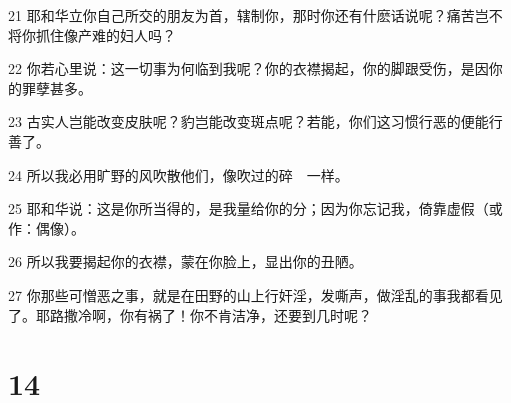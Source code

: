 \par 21 耶和华立你自己所交的朋友为首，辖制你，那时你还有什麽话说呢？痛苦岂不将你抓住像产难的妇人吗？
\par 22 你若心里说：这一切事为何临到我呢？你的衣襟揭起，你的脚跟受伤，是因你的罪孽甚多。
\par 23 古实人岂能改变皮肤呢？豹岂能改变斑点呢？若能，你们这习惯行恶的便能行善了。
\par 24 所以我必用旷野的风吹散他们，像吹过的碎　一样。
\par 25 耶和华说：这是你所当得的，是我量给你的分；因为你忘记我，倚靠虚假（或作：偶像）。
\par 26 所以我要揭起你的衣襟，蒙在你脸上，显出你的丑陋。
\par 27 你那些可憎恶之事，就是在田野的山上行奸淫，发嘶声，做淫乱的事我都看见了。耶路撒冷啊，你有祸了！你不肯洁净，还要到几时呢？

\chapter{14}

